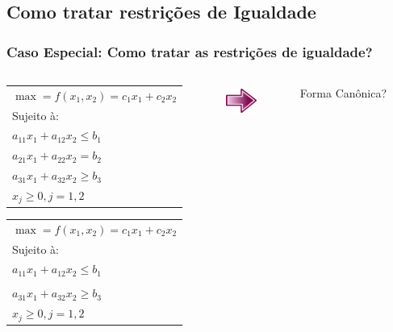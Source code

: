 \documentclass{beamer}
\begin{document}
\subsection{Como tratar restrições de Igualdade}
\begin{frame}
	\frametitle{Caso Especial: Como tratar as restrições de igualdade?}
	\begin{columns}
		\begin{column}{5cm}
			\only<1-2>
			{
				\begin{table}
					\begin{tabular}{l}
						$\max = f(x_1,x_2) = c_1x_1 + c_2x_2$ \\
						Sujeito à: \\
						$a_{11}x_1 + a_{12}x_2 \le b_1 $ \\
						$a_{21}x_1 + a_{22}x_2 = b_2$    \\
						$a_{31}x_1 + a_{32}x_2 \ge b_3 $ \\
						$x_j \ge 0, j = 1, 2$\\
					\end{tabular}
				\end{table}
			}
			{
				\begin{table}
					\begin{tabular}{l}
						$\max = f(x_1,x_2) = c_1x_1 + c_2x_2$ \\
						Sujeito à: \\
						$a_{11}x_1 + a_{12}x_2 \le b_1 $ \\
						\noalign{\hrule height 2pt}
						\multicolumn{1}{!{\vrule width 2pt}l!{\vrule width 1pt}}{\cellcolor{yellow!60} $a_{21}x_1 + a_{22}x_2 = b_2$} \\
						\noalign{\hrule height 2pt}
						\cellcolor{yellow!60} $a_{31}x_1 + a_{32}x_2 \ge b_3 $ \\
						$x_j \ge 0, j = 1, 2$\\
					\end{tabular}
				\end{table}
			}
		\end{column}
		\begin{column}{2cm}
			\only<2->
			{
				\includegraphics[width=1cm,height=1cm]{seta.png}
			}
		\end{column}
		\begin{column}{4cm}
			\centering
			\only<2->
			{
				\Large {\color{red} Forma Canônica?} \\
}
\end{column}
\end{columns}
\end{frame}
\end{document}
